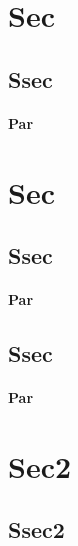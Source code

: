 \documentclass{article}
\begin{document}
\section{Sec}

\subsection{Ssec}

\paragraph{Par}

\section*{Sec}

\subsection*{Ssec}

\paragraph*{Par}


\subsection{Ssec}

\paragraph{Par}

\section*{Sec2}

\subsection*{Ssec2}
\end{document}
